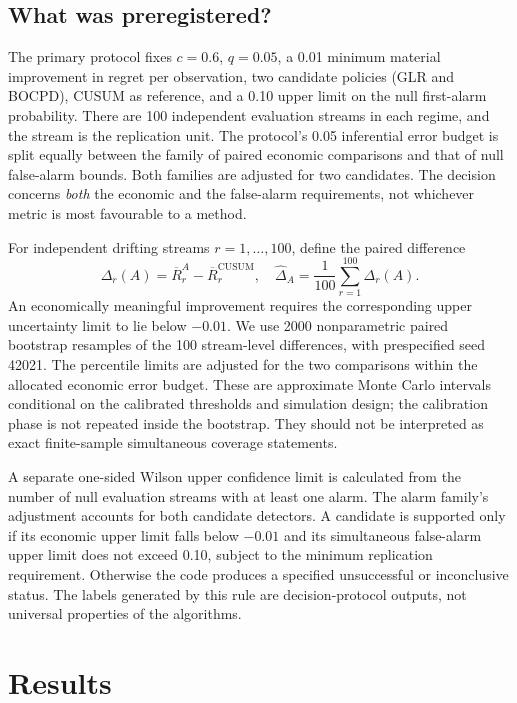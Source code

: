 \documentclass[11pt,a4paper]{article}
\begin{document}
\subsection{What was preregistered?}
The primary protocol fixes $c=0.6$, $q=0.05$, a 0.01 minimum material improvement in regret per observation, two candidate policies (GLR and BOCPD), CUSUM as reference, and a 0.10 upper limit on the null first-alarm probability. There are 100 independent evaluation streams in each regime, and the stream is the replication unit. The protocol's 0.05 inferential error budget is split equally between the family of paired economic comparisons and that of null false-alarm bounds. Both families are adjusted for two candidates. The decision concerns \emph{both} the economic and the false-alarm requirements, not whichever metric is most favourable to a method.

For independent drifting streams $r=1,\ldots,100$, define the paired difference
\begin{equation}\label{eq:paired}
 \Delta_r(A)=\overline R_r^{A}-\overline R_r^{\mathrm{CUSUM}},\quad \widehat\Delta_A=\frac1{100}\sum_{r=1}^{100}\Delta_r(A).
\end{equation}
An economically meaningful improvement requires the corresponding upper uncertainty limit to lie below $-0.01$. We use 2000 nonparametric paired bootstrap resamples of the 100 stream-level differences, with prespecified seed 42021. The percentile limits are adjusted for the two comparisons within the allocated economic error budget. These are approximate Monte Carlo intervals conditional on the calibrated thresholds and simulation design; the calibration phase is not repeated inside the bootstrap. They should not be interpreted as exact finite-sample simultaneous coverage statements.

A separate one-sided Wilson upper confidence limit is calculated from the number of null evaluation streams with at least one alarm. The alarm family's adjustment accounts for both candidate detectors. A candidate is supported only if its economic upper limit falls below $-0.01$ and its simultaneous false-alarm upper limit does not exceed 0.10, subject to the minimum replication requirement. Otherwise the code produces a specified unsuccessful or inconclusive status. The labels generated by this rule are decision-protocol outputs, not universal properties of the algorithms.

\section{Results}\label{sec:results}
\end{document}
